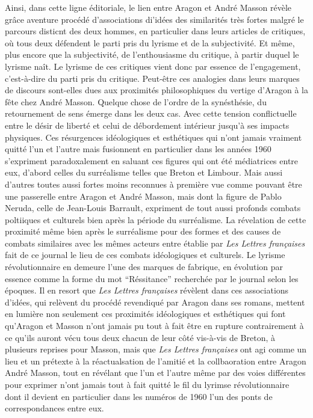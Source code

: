 Ainsi, dans cette ligne éditoriale, le lien entre Aragon et André Masson révèle grâce aventure procédé d'associations di'idées des similarités très fortes malgré le parcours disticnt des deux hommes, en particulier dans leurs articles de critiques, où tous deux défendent le parti pris du lyrisme et de la subjectivité. Et même, plus encore que la subjectivité, de l'enthousiasme du critique, à partir duquel le lyrisme naît. Le lyrisme de ces critiques vient donc par essence de l'engagement, c'est-à-dire du parti pris du critique. Peut-être ces analogies dans leurs marques de discours sont-elles dues aux proximités philosophiques du vertige d'Aragon à la fête chez André Masson. Quelque chose de l'ordre de la synésthésie, du retournement de sens émerge dans les deux cas. Avec cette tension conflictuelle entre le désir de liberté et celui de débordement intérieur jusqu'à ses impacts physiques. Ces résurgences idéologiques et esthétiques qui n'ont jamais vraiment quitté l'un et l'autre mais fusionnent en particulier dans les années 1960 s'expriment paradoxalement en saluant ces figures qui ont été médiatrices entre eux, d'abord celles du surréalisme telles que Breton et Limbour. Mais aussi d'autres toutes aussi fortes moins reconnues à première vue comme pouvant être une passerelle entre Aragon et André Masson, mais dont la figure de Pablo Neruda, celle de Jean-Louis Barrault, expriment de tout aussi profonds combats poltiiques et culturels bien après la période du surréalisme. La révelation de cette proximité même bien après le surréalisme pour des formes et des causes de combats similaires avec les mêmes acteurs entre établie par \emph{Les Lettres françaises} fait de ce journal le lieu de ces combats idéologiques et culturels. Le lyrisme révolutionnaire en demeure l'une des marques de fabrique, en évolution par essence comme la forme du mot \enquote{Réssitance} recherchée par le journal selon les époques. Il en resort que \emph{Les Lettres françaises} révèlent dans ces associations d'idées, qui relèvent du procédé revendiqué par Aragon dans ses romans, mettent en lumière non seulement ces proximités idéologiques et esthétiques qui font qu'Aragon et Masson n'ont jamais pu tout à fait être en rupture contrairement à ce qu'ils auront vécu tous deux chacun de leur côté vis-à-vis de Breton, à plusieurs reprises pour Masson, mais que \emph{Les Lettres françaises} ont agi comme un lieu et un prétexte à la réactualsation de l'amitié et la collbaoration entre Aragon André Masson, tout en révélant que l'un et l'autre même par des voies différentes pour exprimer n'ont jamais tout à fait quitté le fil du lyrimse révolutionnaire dont il devient en particulier dans les numéros de 1960 l'un des ponts de correspondances entre eux. 


